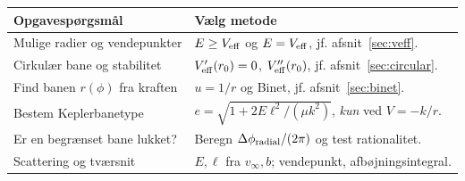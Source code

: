 \begin{center}\small\renewcommand{\arraystretch}{1.19}\begin{tabular}{p{50mm}p{86mm}}\toprule
\textbf{Opgavespørgsmål} & \textbf{Vælg metode}\\\midrule
Mulige radier og vendepunkter & $E\ge V_{\rm eff}$ og $E=V_{\rm eff}$, jf. afsnit~\ref{sec:veff}.\\
Cirkulær bane og stabilitet & $V_{\rm eff}'(r_0)=0$, $V_{\rm eff}''(r_0)$, jf. afsnit~\ref{sec:circular}.\\
Find banen $r(\phi)$ fra kraften & $u=1/r$ og Binet, jf. afsnit~\ref{sec:binet}.\\
Bestem Keplerbanetype & $e=\sqrt{1+2E\ell^2/(\mu k^2)}$, \emph{kun} ved $V=-k/r$.\\
Er en begrænset bane lukket? & Beregn $\Delta\phi_{\rm radial}/(2\pi)$ og test rationalitet.\\
Scattering og tværsnit & $E,\ell$ fra $v_\infty,b$; vendepunkt, afbøjningsintegral.\\
\bottomrule\end{tabular}\end{center}
